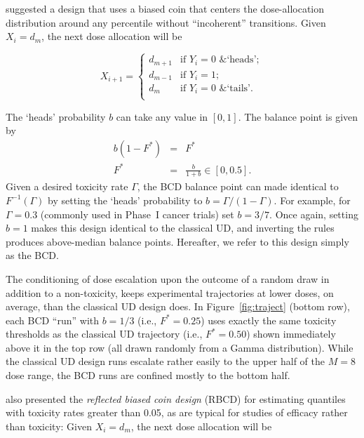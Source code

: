 \cite{Durh:Flou:rand:1994} suggested a design that uses a biased coin that centers the dose-allocation distribution around any percentile without ``incoherent'' transitions. Given $X_i=d_m$, the next dose allocation will be

\begin{equation}\label{eq:DF_BCD}
X_{i+1}=
\begin{cases}
d_{m+1} &\textrm{if $Y_i=0$ \& `heads'};\\
d_{m-1} &\textrm{if $Y_i=1$};\\
d_m &\textrm{if $Y_i=0$ \& `tails'}.\\
\end{cases}
\end{equation}

The `heads' probability $b$ can take any value in $[0,1]$. The balance point is given by
\begin{equation}\label{eq:bcdx*}
\begin{array}{rcl}
    b\left(1-F^*\right) &=& F^*\\
    F^* &=& \frac{b}{1+b}\in[0,0.5].
\end{array}
\end{equation}
%
Given a desired toxicity rate $\Gamma$, the BCD balance point can made identical to $F^{-1}(\Gamma)$ by setting the `heads' probability to $b=\Gamma/(1-\Gamma)$. For example, for $\Gamma=0.3$ (commonly used in Phase~I cancer trials) set $b=3/7$. Once again, setting $b=1$ makes this design identical to the classical UD, and inverting the rules produces above-median balance points. Hereafter, we refer to this design simply as the BCD.

The conditioning of dose escalation upon the outcome of a random draw in addition to a non-toxicity, keeps experimental trajectories at lower doses, on average, than the classical UD design does. In Figure~\ref{fig:traject} (bottom row), each BCD ``run'' with $b=1/3$ (i.e., $F^*=0.25$) uses exactly the same toxicity thresholds as the classical UD trajectory (i.e., $F^*=0.50$) shown immediately above it in the top row (all drawn randomly from a Gamma distribution). While the classical UD design runs escalate rather easily to the upper half of the $M=8$ dose range, the BCD runs are confined mostly to the bottom half.

\cite{Durh:Flou:rand:1994} also presented the \emph{reflected biased coin design} (RBCD) for estimating quantiles with toxicity rates greater than 0.05, as are typical for studies of efficacy rather than toxicity: Given $X_i=d_m$, the next dose allocation will be

